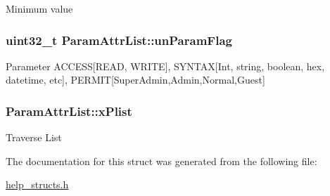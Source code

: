 Minimum value \hypertarget{structParamAttrList_a8188e3f7aa3c97eda168df546152e0ae}{
\subsubsection[{un\-Param\-Flag}]{\setlength{\rightskip}{0pt plus 5cm}uint32\-\_\-t Param\-Attr\-List\-::un\-Param\-Flag}}\label{structParamAttrList_a8188e3f7aa3c97eda168df546152e0ae}
Parameter A\-C\-C\-E\-S\-S\mbox{[}R\-E\-A\-D, W\-R\-I\-T\-E\mbox{]}, S\-Y\-N\-T\-A\-X\mbox{[}Int, string, boolean, hex, datetime, etc\mbox{]}, P\-E\-R\-M\-I\-T\mbox{[}Super\-Admin,Admin,Normal,Guest\mbox{]} \hypertarget{structParamAttrList_a7eece3633e85108272b7629c06100271}{
\subsubsection[{x\-Plist}]{ Param\-Attr\-List\-::x\-Plist}}\label{structParamAttrList_a7eece3633e85108272b7629c06100271}
Traverse List 

The documentation for this struct was generated from the following file\-:\begin{DoxyCompactItemize}
\item 
\hyperlink{help__structs_8h}{help\-\_\-structs.\-h}\end{DoxyCompactItemize}
